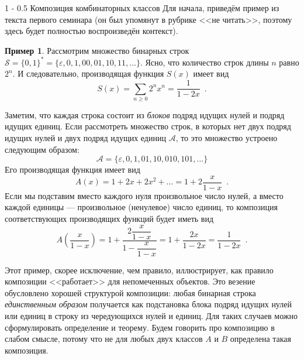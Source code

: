 \documentclass{article}
\makeatletter
\theoremstyle{definition}
\newtheorem{example}{Пример}
\renewcommand{\subsection}{\@startsection
{subsection}%
{1}%
{\z@}%
{-\baselineskip}%
{0.5\baselineskip}%
{\centering\large\scshape}} %
\makeatother
\begin{document}
\subsection{Композиция комбинаторных классов}
Для начала, приведём пример из текста первого семинара (он был упомянут в
рубрике <<не читать>>, поэтому здесь будет полностью воспроизведён контекст).

\begin{example}
	Рассмотрим множество бинарных строк \( \mathcal S = \{0, 1\}^{\ast} = \{ 
	\varepsilon, 0, 1, 00, 01, 10, 11, \ldots \} \).  Ясно, что количество строк 
	длины \( n \) равно \( 2^n \). И следовательно, производящая функция \( 
	S(x) \) имеет вид
	\[
		S(x) = \sum_{n \geq 0} 2^n x^n = \dfrac{1}{1 - 2x}	 \enspace .
	\]

	Заметим, что каждая строка 
	состоит из \textit{блоков} подряд идущих нулей и подряд идущих единиц. Если 
	рассмотреть множество строк, в которых нет двух подряд идущих нулей и двух 
	подряд идущих единиц \( \mathcal A \), то это множество устроено следующим 
	образом:
	\[
		\mathcal A = \{ \varepsilon, 0, 1, 01, 10, 010, 101, \ldots \}
	\]
	Его производящая функция имеет вид
	\[
		A(x) = 1 + 2x + 2x^2 + \ldots = 1 + 2\dfrac{x}{1 - x} \enspace .
	\]
	Если мы подставим вместо каждого нуля произвольное число нулей, а вместо 
	каждой единицы --- произвольное (ненулевое) число единиц, то композиция 
	соответствующих производящих функций будет иметь вид
	\[
		A\left( \dfrac{x}{1 - x}\right) = 1 + \dfrac{2\dfrac{x}{1- x}}{1 - 
		\dfrac{x}{1 - x}} = 1 + \dfrac{2x}{1 - 2x} = \dfrac{1}{1 - 2x} \enspace 
		.
	\]
\end{example}
Этот пример, скорее исключение, чем правило, иллюстрирует, как правило
композиции <<работает>> для непомеченных объектов. Это везение обусловлено
хорошей структурой композиции: любая бинарная строка \textit{единственным
образом} получается как подстановка блока подряд идущих нулей или единиц в
строку из чередующихся нулей и единиц. Для таких случаев можно сформулировать
определение и теорему. Будем говорить про композицию в слабом смысле, потому что
не для любых двух классов \( A \) и \( B \) определена такая композиция.
\end{document}
